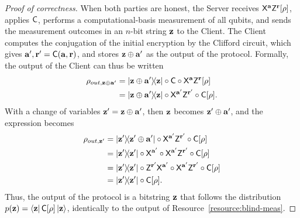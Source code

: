 \begin{proof}[Proof of correctness]
    When both parties are honest, the Server receives $\mathsf{X}^{\mathbf a}\mathsf{Z}^{\mathbf r}[\rho]$, applies $\mathsf{C}$, performs a computational-basis measurement of all qubits, and sends the measurement outcomes in an $n$-bit string $\mathbf z$ to the Client. The Client computes the conjugation of the initial encryption by the Clifford circuit, which gives $\mathbf a', \mathbf r'=\mathsf{C}(\mathbf a, \mathbf r)$, and stores $\mathbf z\oplus\mathbf a'$ as the output of the protocol. Formally, the output of the Client can thus be written
    \begin{align}
        \rho_{out, \mathbf z\oplus\mathbf a'} &=
        \ketbra{\mathbf z\oplus\mathbf a'}{\mathbf z}
        \circ
        \mathsf{C}
        \circ \mathsf{X}^{\mathbf a}\mathsf{Z}^{\mathbf r}[\rho]
        \\
        &=
        \ketbra{\mathbf z\oplus\mathbf a'}{\mathbf z}
        \circ
        \mathsf{X}^{\mathbf a'}\mathsf{Z}^{\mathbf r'}
        \circ
        \mathsf{C}
        [\rho].
    \end{align}
    With a change of variables $\mathbf z'= \mathbf z\oplus \mathbf a'$, then $\mathbf z$ becomes $\mathbf z'\oplus \mathbf a'$, and the expression becomes
    \begin{align}
        \rho_{out, \mathbf z'}
        &=
        \ketbra{\mathbf z'}{\mathbf z'\oplus \mathbf a'}
        \circ
        \mathsf{X}^{\mathbf a'}\mathsf{Z}^{\mathbf r'}
        \circ
        \mathsf{C}
        [\rho]
        \\
        &=
        \ketbra{\mathbf z'}{\mathbf z'}
        \circ
        \mathsf{X}^{\mathbf a'}
        \circ
        \mathsf{X}^{\mathbf a'}\mathsf{Z}^{\mathbf r'}
        \circ
        \mathsf{C}
        [\rho]
        \\
        &=
        \ketbra{\mathbf z'}{\mathbf z'}
        \circ
        \mathsf{Z}^{\mathbf r'}\mathsf{X}^{\mathbf a'}
        \circ
        \mathsf{X}^{\mathbf a'}\mathsf{Z}^{\mathbf r'}
        \circ
        \mathsf{C}
        [\rho]
        \\
        &=
        \ketbra{\mathbf z'}{\mathbf z'}
        \circ
        \mathsf{C}
        [\rho].
    \end{align}
    Thus, the output of the protocol is a bitstring $\mathbf z$ that follows the distribution $p(\mathbf z)=\bra{\mathbf z}\mathsf{C}[\rho]\ket{\mathbf z}$, identically to the output of Resource~\ref{resource:blind-meas}.
\end{proof}

